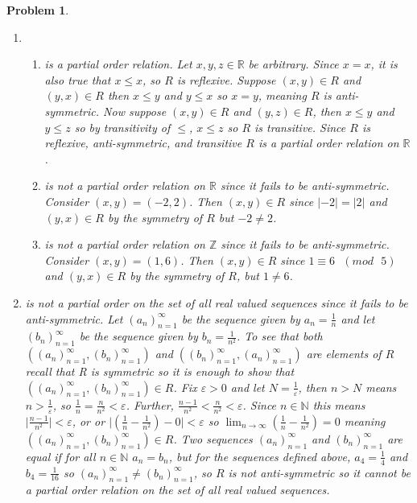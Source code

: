 \documentclass{article}
\newtheorem{Problem}{Problem}
\begin{document}
\begin{Problem}
\renewcommand{\labelenumii}{\roman{enumii}}
\begin{enumerate}
    \item 
    \begin{enumerate}
        \item is a partial order relation.  Let $x,y,z\in\mathbb{R}$ be arbitrary.  Since $x=x$, it is also true that $x\leq x$, so $R$ is reflexive.  Suppose $(x,y)\in R$ and $(y,x)\in R$ then $x\leq y$ and $y\leq x$ so $x=y$, meaning $R$ is anti-symmetric.  Now suppose $(x,y)\in R$ and $(y,z)\in R$, then $x\leq y$ and $y\leq z$ so by transitivity of $\leq$, $x\leq z$ so $R$ is transitive.  Since $R$ is reflexive, anti-symmetric, and transitive $R$ is a partial order relation on $\mathbb{R}$.
        \item is not a partial order relation on $\mathbb{R}$ since it fails to be anti-symmetric.  Consider $(x,y)=(-2,2)$.  Then $(x,y)\in R$ since $\lvert -2\rvert=\lvert 2\rvert$ and $(y,x)\in R$ by the symmetry of $R$ but $-2\neq2$.
        \item is not a partial order relation on $\mathbb{Z}$ since it fails to be anti-symmetric.  Consider $(x,y)=(1,6)$.  Then $(x,y)\in R$ since $1\equiv 6\text{ }(mod\text{ }5)$ and $(y,x)\in R$ by the symmetry of $R$, but $1\neq 6$.
    \end{enumerate}
    \item is not a partial order on the set of all real valued sequences since it fails to be anti-symmetric.  Let $(a_n)_{n=1}^\infty$ be the sequence given by $a_n=\frac{1}{n}$ and let $(b_n)_{n=1}^\infty$ be the sequence given by $b_n=\frac{1}{n^2}$.  To see that both $((a_n)_{n=1}^\infty,(b_n)_{n=1}^\infty)$ and $((b_n)_{n=1}^\infty,(a_n)_{n=1}^\infty)$ are elements of $R$ recall that R is symmetric so it is enough to show that $((a_n)_{n=1}^\infty,(b_n)_{n=1}^\infty)\in R$.  Fix $\varepsilon>0$ and let $N=\frac{1}{\varepsilon}$, then $n>N$ means $n>\frac{1}{\varepsilon}$, so $\frac{1}{n}=\frac{n}{n^2}<\varepsilon$.  Further, $\frac{n-1}{n^2}<\frac{n}{n^2}<\varepsilon$.  Since $n\in\mathbb{N}$ this means $\lvert\frac{n-1}{n^2}\rvert<\varepsilon$, or or $\lvert(\frac{1}{n}-\frac{1}{n^2})-0\rvert<\varepsilon$ so $\lim_{n\to\infty}(\frac{1}{n}-\frac{1}{n^2})=0$ meaning $((a_n)_{n=1}^\infty,(b_n)_{n=1}^\infty)\in R$.  Two sequences $(a_n)_{n=1}^\infty$ and $(b_n)_{n=1}^\infty$ are equal if for all $n\in\mathbb{N}$ $a_n=b_n$, but for the sequences defined above, $a_4=\frac{1}{4}$ and $b_4=\frac{1}{16}$ so $(a_n)_{n=1}^\infty\neq(b_n)_{n=1}^\infty$, so $R$ is not anti-symmetric so it cannot be a partial order relation on the set of all real valued sequences.

\end{enumerate}
\end{Problem}
\end{document}
